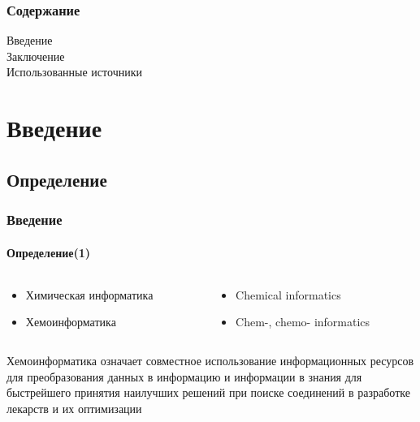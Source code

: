 



\thispagestyle{empty}

\begin{frame}
  \maketitle
\end{frame}

\setcounter{page}{1}

\begin{frame}
  \frametitle{Содержание} 
  Введение \\[0.3cm]
  \tableofcontents
  Заключение \\[0.3cm]
  Использованные источники
\end{frame}

\section{Введение}
\subsection{Определение}

\begin{frame}
  \frametitle{Введение}
  \framesubtitle{Определение(1)}

  \begin{columns}
    \begin{column}{0.5\textwidth}
       \begin{itemize}
         \item Химическая информатика
         \item Хемоинформатика
       \end{itemize}
    \end{column}
    \begin{column}{0.5\textwidth}
       \begin{itemize}
         \item Chemical informatics
         \item Chem-, chemo- informatics
       \end{itemize}
    \end{column}
  \end{columns}

  \begin{defn}[Ф.К.Браун, 1998]
     Хемоинформатика означает совместное использование информационных ресурсов для преобразования данных
     в информацию и информации в знания для быстрейшего принятия наилучших решений при поиске соединений
     в разработке лекарств и их оптимизации 
  \end{defn}

\end{frame}

